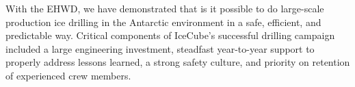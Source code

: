 With the EHWD, we have demonstrated that is it possible to do large-scale production ice drilling in the Antarctic environment in a safe, efficient, and predictable way.  Critical components of IceCube’s successful drilling campaign included a large engineering investment, steadfast year-to-year support to properly address lessons learned, a strong safety culture, and priority on retention of experienced crew members.
